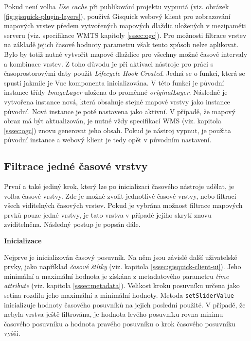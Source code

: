 Pokud není volba \textit{Use cache} při publikování projektu vypnutá
(viz. obrázek \ref{fig:gisquick-plugin-layers}), používá Gisquick
webový klient pro zobrazování mapových vrstev předem vytvořených
mapových dlaždic uložených v mezipaměti serveru (viz. specifikace WMTS
kapitoly \ref{sssec:ogc}). Pro možnosti filtrace vrstev na základě
jejich časové hodnoty parametru však tento způsob nelze
aplikovat. Bylo by totiž nutné vytvořit mapové dlaždice pro všechny
možné časové intervaly a kombinace vrstev. Z toho důvodu je při
aktivaci nástroje pro práci s časoprostorovými daty
použit \textit{Lifecycle Hook Created}. Jedná se o funkci, která se
spustí jakmile je Vue komponenta inicializována. V této funkci je původní
instance třídy \textit{ImageLayer} uložena do
proměnné \textit{originalLayer}. Následně je vytvořena
instance nová, která obsahuje stejné mapové vrstvy jako instance původní. 
Nová instance je
poté nastavena jako aktivní. V případě, že mapový obraz má být
aktualizován, je nutné vždy specifikací WMS
(viz. kapitola \ref{sssec:ogc}) znovu generovat jeho obsah. Pokud je
nástroj vypnut, je použita původní instance a webový klient je tedy
opět v původním nastavení.

\subsection{Filtrace jedné časové vrstvy}
\label{sssec:one-layer-filtration}

První a také jediný krok, který lze po inicializaci časového nástroje
udělat, je volba časové vrstvy. Zde je možné zvolit jednotlivé časové
vrstvy, nebo filtraci všech viditelných časových vrstev. Pokud je
vybrána možnost filtrace mapových prvků pouze jedné vrstvy, je tato
vrstva v případě jejího skrytí znovu zviditelněna. Následný postup
je popsán dále.

\bigskip
\noindent \textbf{Inicializace}

Nejprve je inicializován časový posuvník. Na něm jsou závislé
další uživatelské prvky, jako například \textit{časové štítky}
(viz. kapitola \ref{sssec:gisquick-client-ui}). Jeho minimální a maximální
hodnota je získána z metadatového parametru \textit{time\textunderscore
attribute} (viz. kapitola \ref{sssec:metadata}). Velikost kroku posuvníku
určena jako setina rozdílu jeho maximální a minimální hodnoty. Metoda
\verb|setSliderValue| inicializuje hodnoty časového posuvníků na jejich poslední
použité. V případě, že nebyla vrstva ještě filtrována, je hodnota
levého posuvníku rovna minimu časového posuvníku a hodnota pravého
posuvníku o krok časového posuvníku vyšší.

